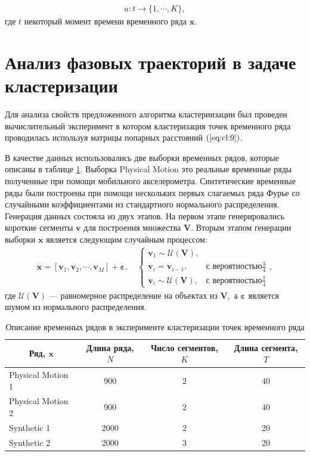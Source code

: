 \[
\label{eq:cl:10}
\begin{aligned}
a : t \to \{1,\cdots, K\}, 
\end{aligned}
\]
где $t$ некоторый момент времени временного ряда $\textbf{x}$.

\section{Анализ фазовых траекторий в задаче кластеризации}
Для анализа свойств предложенного алгоритма кластериизации был проведен вычислительный эксперимент в котором кластеризация точек временного ряда проводилась используя матрицы попарных расстояний $(\ref{eq:cl:9})$.

В качестве данных использовались две выборки временных рядов, которые описаны в таблице \ref{table_1}. 
Выборка Physical Motion это реальные временные ряды полученные при помощи мобильного акселерометра. 
Синтетические временные ряды были построены при помощи нескольких первых слагаемых ряда Фурье со случайными коэффициентами из стандартного нормального распределения. 
Генерация данных состояла из двух этапов. 
На первом этапе генерировались короткие сегменты $\textbf{v}$ для построения множества $\mathbf{V}$. 
Вторым этапом генерации выборки $\textbf{x}$ является следующим случайным процессом:
\[
\label{eq:exp:1}
\begin{aligned}
\textbf{x} = [\textbf{v}_{1}, \textbf{v}_{2}, \cdots, \textbf{v}_{M}] + \bm{\varepsilon}, \quad \begin{cases}
    \textbf{v}_{1} \sim \mathcal{U}\left(\mathbf{V}\right),\\
    \textbf{v}_{i} = \textbf{v}_{i - 1}, & \text{с вероятностью} \frac{3}{4}\\
    \textbf{v}_{i} \sim \mathcal{U}\left(\mathbf{V}\right), & \text{с вероятностью} \frac{1}{4}
\end{cases},
\end{aligned}
\]
где $\mathcal{U}\left(\mathbf{V}\right)$ --- равномерное распределение на объектах из $\mathbf{V},$ а $\bm{\varepsilon}$ является шумом из нормального распределения.

\begin{table}[h!t]
\begin{center}
\caption{Описание временных рядов в эксперименте кластеризации точек временного ряда}
\label{table_1}
\begin{tabular}{|c|c|c|c|}
\hline
	Ряд, $\textbf{x}$ &Длина ряда, $N$& Число сегментов, $K$&Длина сегмента, $T$\\
	\hline
	\multicolumn{1}{|l|}{Physical Motion 1}
	& 900& 2& 40\\
	\hline
	\multicolumn{1}{|l|}{Physical Motion 2}
	& 900& 2& 40\\
	\hline
	\multicolumn{1}{|l|}{Synthetic 1}
	& 2000& 2& 20\\
	\hline
	\multicolumn{1}{|l|}{Synthetic 2}
	& 2000& 3& 20\\
\hline

\end{tabular}
\end{center}
\end{table}

